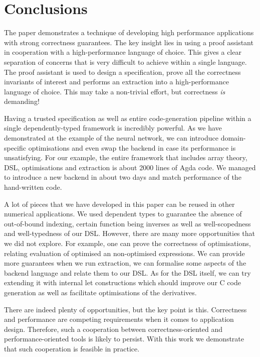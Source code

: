 \section{Conclusions\label{sec:conclusions}}

The paper demonstrates a technique of developing high performance applications with
strong correctness guarantees.  The key insight lies in using a proof assistant
in cooperation with a high-performance language of choice.  This gives a clear
separation of concerns that is very difficult to achieve within a single
language.  The proof assistant is used to design a specification, prove
all the correctness invariants of interest and performs an extraction
into a high-performance language of choice.  This may take a non-trivial
effort, but correctness \emph{is} demanding!

Having a trusted specification as well as entire code-generation pipeline
within a single dependently-typed framework is incredibly powerful.
As we have demonstrated at the example of the neural network, we can introduce domain-specific
optimisations and even swap the backend in case its performance is unsatisfying.
For our example, the entire framework that includes array theory, DSL,
optimisations and extraction is about 2000 lines of Agda code.  We managed
to introduce a new backend in about two days and match performance of
the hand-written code.

A lot of pieces that we have developed in this
paper can be reused in other numerical applications.  We used dependent
types to guarantee the absence of out-of-bound indexing, certain function being
inverses as well as well-scopedness and well-typedness of our DSL.
However, there are many more opportunities that we did not explore.
For example, one can prove the correctness of optimisations, relating
evaluation of optimised an non-optimised expressions.  We can provide
more guarantees when we run extraction, \eg{} we can formalise some
aspects of the backend language and relate them to our DSL.
As for the DSL itself, we can try extending it with internal let
constructions which should improve our C code generation as well as
facilitate optimisations of the derivatives.

There are indeed plenty of opportunities, but the key point is this.
Correctness and performance are competing requirements when it
comes to application design.  Therefore, such a cooperation between
correctness-oriented and performance-oriented tools is likely to
persist.  With this work we demonstrate that such cooperation
is feasible in practice.

